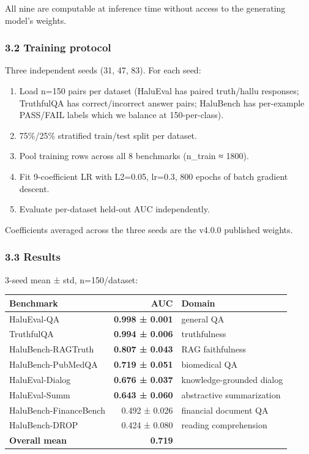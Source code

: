 \documentclass[
  11pt]{article}
\newcounter{none} %
\providecommand{\tightlist}{%
  \setlength{\itemsep}{0pt}\setlength{\parskip}{0pt}}
\begin{document}
All nine are computable at inference time without access to the
generating model's weights.

\subsubsection{3.2 Training protocol}\label{training-protocol}

Three independent seeds (31, 47, 83). For each seed:

\begin{enumerate}
\def\labelenumi{\arabic{enumi}.}
\tightlist
\item
  Load n=150 pairs per dataset (HaluEval has paired truth/hallu
  responses; TruthfulQA has correct/incorrect answer pairs; HaluBench
  has per-example PASS/FAIL labels which we balance at 150-per-class).
\item
  75\%/25\% stratified train/test split per dataset.
\item
  Pool training rows across all 8 benchmarks (n\_train ≈ 1800).
\item
  Fit 9-coefficient LR with L2=0.05, lr=0.3, 800 epochs of batch
  gradient descent.
\item
  Evaluate per-dataset held-out AUC independently.
\end{enumerate}

Coefficients averaged across the three seeds are the v4.0.0 published
weights.

\subsubsection{3.3 Results}\label{results}

3-seed mean ± std, n=150/dataset:

{\def\LTcaptype{none} %
\begin{longtable}[]{@{}lrl@{}}
\toprule\noalign{}
Benchmark & AUC & Domain \\
\midrule\noalign{}
\endhead
\bottomrule\noalign{}
\endlastfoot
HaluEval-QA & \textbf{0.998 ± 0.001} & general QA \\
TruthfulQA & \textbf{0.994 ± 0.006} & truthfulness \\
HaluBench-RAGTruth & \textbf{0.807 ± 0.043} & RAG faithfulness \\
HaluBench-PubMedQA & \textbf{0.719 ± 0.051} & biomedical QA \\
HaluEval-Dialog & \textbf{0.676 ± 0.037} & knowledge-grounded dialog \\
HaluEval-Summ & \textbf{0.643 ± 0.060} & abstractive summarization \\
HaluBench-FinanceBench & 0.492 ± 0.026 & financial document QA \\
HaluBench-DROP & 0.424 ± 0.080 & reading comprehension \\
\textbf{Overall mean} & \textbf{0.719} & \\
\end{longtable}
}
\end{document}
